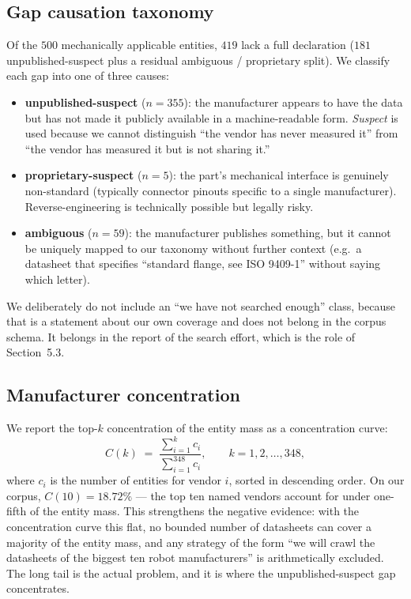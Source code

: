 \documentclass[11pt,twocolumn]{article}
\begin{document}
\subsection{Gap causation taxonomy}

Of the $500$ mechanically applicable entities, $419$ lack a full
declaration ($181$ unpublished-suspect plus a residual ambiguous /
proprietary split). We classify each gap into one of three causes:

\begin{itemize}[nosep,leftmargin=*]
\item \textbf{unpublished-suspect} ($n=355$): the manufacturer
appears to have the data but has not made it publicly available in a
machine-readable form. \emph{Suspect} is used because we cannot
distinguish ``the vendor has never measured it'' from ``the vendor
has measured it but is not sharing it.''

\item \textbf{proprietary-suspect} ($n=5$): the part's mechanical
interface is genuinely non-standard (typically connector pinouts
specific to a single manufacturer). Reverse-engineering is technically
possible but legally risky.

\item \textbf{ambiguous} ($n=59$): the manufacturer publishes
something, but it cannot be uniquely mapped to our taxonomy without
further context (e.g.\ a datasheet that specifies ``standard flange,
see ISO 9409-1'' without saying which letter).
\end{itemize}

We deliberately do not include an ``we have not searched enough''
class, because that is a statement about our own coverage and does
not belong in the corpus schema. It belongs in the report of the
search effort, which is the role of Section~5.3.

\subsection{Manufacturer concentration}

We report the top-$k$ concentration of the entity mass as a
concentration curve:
\begin{equation}
  C(k) \;=\; \frac{\sum_{i=1}^{k} c_i}{\sum_{i=1}^{348} c_i},
  \qquad k = 1, 2, \ldots, 348,
  \label{eq:conc}
\end{equation}
where $c_i$ is the number of entities for vendor $i$, sorted in
descending order. On our corpus, $C(10) = 18.72\%$ — the top ten
named vendors account for under one-fifth of the entity mass. This
strengthens the negative evidence: with the concentration curve this
flat, no bounded number of datasheets can cover a majority of the
entity mass, and any strategy of the form ``we will crawl the
datasheets of the biggest ten robot manufacturers'' is arithmetically
excluded. The long tail is the actual problem, and it is where the
unpublished-suspect gap concentrates.
\end{document}
